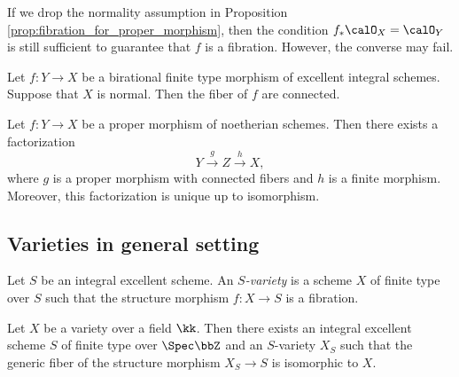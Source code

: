     \begin{remark}\label{rmk:normality_in_definition_of_fibration}
        If we drop the normality assumption in Proposition \ref{prop:fibration_for_proper_morphism}, then the condition \(f_*\calO_X = \calO_Y\) is still sufficient to guarantee that \(f\) is a fibration.
        However, the converse may fail.

    \end{remark}

    \begin{theorem}\label{thm:Zariski_main_theorem}
        Let \(f: Y \to X\) be a birational finite type morphism of excellent integral schemes.
        Suppose that \(X\) is normal.
        Then the fiber of \(f\) are connected.
    \end{theorem}

    \begin{theorem}\label{thm:Stein_factorization}
        Let \(f: Y \to X\) be a proper morphism of noetherian schemes.
        Then there exists a factorization
        \[
            Y \xrightarrow{g} Z \xrightarrow{h} X,
        \]
        where \(g\) is a proper morphism with connected fibers and \(h\) is a finite morphism.
        Moreover, this factorization is unique up to isomorphism.
    \end{theorem}



\subsection{Varieties in general setting}

    \begin{definition}\label{def:varieties_in_general_setting}
        Let \(S\) be an integral excellent scheme.
        An \emph{\(S\)-variety} is a scheme \(X\) of finite type over \(S\) such that the structure morphism \(f: X \to S\) is a fibration.
        \Yang{}
    \end{definition}


    \begin{theorem}\label{thm:spread_out}
        Let \(X\) be a variety over a field \(\kk\).
        Then there exists an integral excellent scheme \(S\) of finite type over \(\Spec \bbZ\) and an \(S\)-variety \(X_S\) such that the generic fiber of the structure morphism \(X_S \to S\) is isomorphic to \(X\).
        \Yang{}
    \end{theorem}
